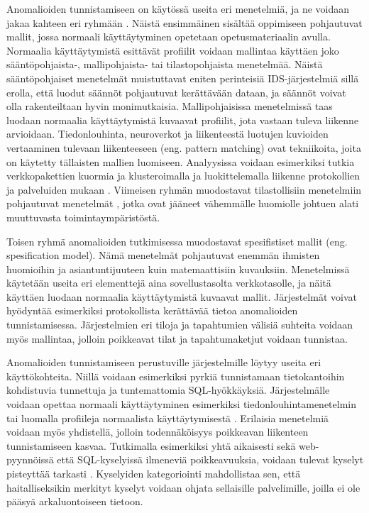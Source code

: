 Anomalioiden tunnistamiseen on käytössä useita eri menetelmiä, ja ne voidaan jakaa kahteen eri ryhmään \cite{State}. Näistä ensimmäinen sisältää oppimiseen pohjautuvat mallit, jossa normaali 
käyttäytyminen opetetaan opetusmateriaalin avulla. Normaalia käyttäytymistä esittävät profiilit voidaan mallintaa käyttäen joko sään\-tö\-poh\-jais\-ta-, mallipohjaista- tai tilastopohjaista menetelmää. Näistä
sääntöpohjaiset menetelmät muistuttavat eniten perinteisiä IDS-järjestelmiä sillä erolla, että luodut säännöt pohjautuvat kerättävään dataan, ja säännöt voivat olla rakenteiltaan hyvin monimutkaisia. 
Mallipohjaisissa menetelmissä taas luodaan normaalia käyttäytymistä kuvaavat profiilit, jota vastaan tuleva liikenne arvioidaan. Tiedonlouhinta, neuroverkot ja liikenteestä luotujen kuvioiden vertaaminen
tulevaan liikenteeseen (eng. pattern matching) ovat tekniikoita, joita on käytetty tällaisten mallien luomiseen. Analyysissa voidaan esimerkiksi tutkia verkkopakettien kuormia \cite{Payload}\cite{ULISSE} 
ja klusteroimalla ja luokittelemalla liikenne protokollien ja palveluiden mukaan \cite{Cluster}. Viimeisen ryhmän muodostavat tilastollisiin menetelmiin pohjautuvat menetelmät \cite{PacketHeader}, jotka
ovat jääneet vähemmälle huomiolle johtuen alati muuttuvasta toimintaympäristöstä.

Toisen ryhmä anomalioiden tutkimisessa muodostavat spesifistiset mallit (eng. spesification model). Nämä menetelmät pohjautuvat enemmän ihmisten huomioihin ja asiantuntijuuteen kuin matemaattisiin
kuvauksiin. Menetelmissä käytetään useita eri elementtejä aina sovellustasolta verkkotasolle, ja näitä käyttäen luodaan normaalia käyttäytymistä kuvaavat mallit. Järjestelmät voivat hyödyntää esimerkiksi
protokollista kerättävää tietoa anomalioiden tunnistamisessa. Järjestelmien eri tiloja ja tapahtumien välisiä suhteita voidaan myös mallintaa, jolloin poikkeavat tilat ja tapahtumaketjut voidaan
tunnistaa. 

Anomalioiden tunnistamiseen perustuville järjestelmille löytyy useita eri käyttökohteita. Niillä voidaan esimerkiksi pyrkiä tunnistamaan tietokantoihin kohdistuvia tunnettuja ja tuntemattomia SQL-hyökkäyksiä.
Järjestelmälle voidaan opettaa normaali käyttäytyminen esimerkiksi tiedonlouhintamenetelmin \cite{Data} tai luomalla profiileja normaalista käyttäytymisestä \cite{SQLanomaly}\cite{SQLlearning}. Erilaisia
menetelmiä voidaan myös yhdistellä, jolloin todennäköisyys poikkeavan liikenteen tunnistamiseen kasvaa. Tutkimalla esimerkiksi yhtä aikaisesti sekä web-pyynnöissä että SQL-kyselyissä ilmeneviä poikkeavuuksia, 
voidaan tulevat kyselyt pisteyttää tarkasti \cite{WebSQL}. Kyselyiden kategoriointi mahdollistaa sen, että haitalliseksikin merkityt kyselyt voidaan ohjata sellaisille palvelimille, joilla ei ole 
pääsyä arkaluontoiseen tietoon. 

